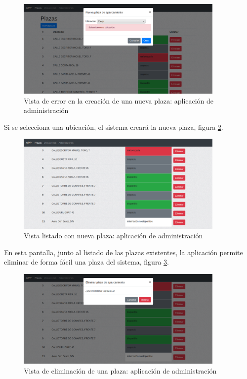 \begin{figure}[H]
	\centering
	\includegraphics[width=0.9\textwidth]{imagenes/administracion/plazas_nueva_error.png}
	\caption{Vista de error en la creación de una nueva plaza: aplicación de administración}
	\label{administracion_plazas_nueva_error}
\end{figure}
Si se selecciona una ubicación, el sistema creará la nueva plaza, figura \ref{administracion_plazas_creada}.
\begin{figure}[H]
	\centering
	\includegraphics[width=0.9\textwidth]{imagenes/administracion/plazas_creada.png}
	\caption{Vista listado con nueva plaza: aplicación de administración}
	\label{administracion_plazas_creada}
\end{figure}
En esta pantalla, junto al listado de las plazas existentes, la aplicación permite eliminar de forma fácil una plaza del sistema, figura \ref{administracion_plazas_eliminar}.
\begin{figure}[H]
	\centering
	\includegraphics[width=0.9\textwidth]{imagenes/administracion/plazas_eliminar.png}
	\caption{Vista de eliminación de una plaza: aplicación de administración}
	\label{administracion_plazas_eliminar}
\end{figure}


